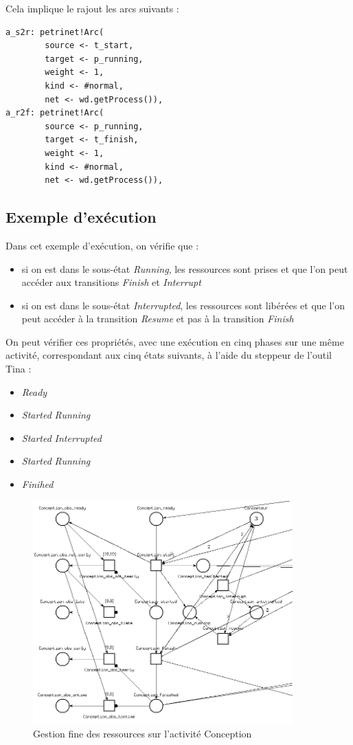 Cela implique le rajout les arcs suivants :
\begin{verbatim}
a_s2r: petrinet!Arc(
        source <- t_start,
        target <- p_running,
        weight <- 1,
        kind <- #normal,
        net <- wd.getProcess()),
a_r2f: petrinet!Arc(
        source <- p_running,
        target <- t_finish,
        weight <- 1,
        kind <- #normal,
        net <- wd.getProcess()),
\end{verbatim}

\subsection{Exemple d'exécution}

Dans cet exemple d'exécution, on vérifie que :
\begin{itemize}
\item si on est dans le sous-état \textit{Running}, les ressources sont prises et que l'on peut accéder aux transitions \textit{Finish} et \textit{Interrupt}
\item si on est dans le sous-état \textit{Interrupted}, les ressources sont libérées et que l'on peut accéder à la transition \textit{Resume} et pas à la transition \textit{Finish}\\
\end{itemize}

On peut vérifier ces propriétés, avec une exécution en cinq phases sur une même activité, correspondant aux cinq états suivants, à l'aide du steppeur de l'outil Tina : 
\begin{itemize}
\item \textit{Ready}
\item \textit{Started} \textit{Running}
\item \textit{Started} \textit{Interrupted}
\item \textit{Started} \textit{Running}
\item \textit{Finihed}
\end{itemize}

\begin{figure}[!h] 
\begin{center}
\includegraphics[width=10cm]{Capture-19.png}
\caption{Gestion fine des ressources sur l'activité Conception} 
\label{img1} 
\end{center}
\end{figure} 


